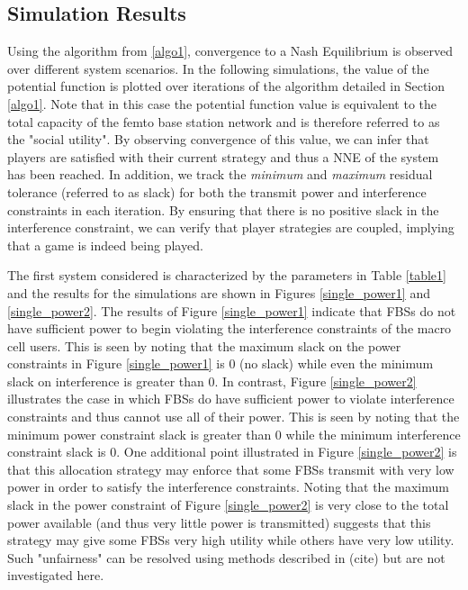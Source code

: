 \subsection{Simulation Results}
Using the algorithm from \ref{algo1}, convergence to a Nash Equilibrium is observed over different system scenarios. 
In the following simulations, the value of the potential function is plotted over iterations of the algorithm detailed in Section \ref{algo1}. Note that in this case the potential function value is equivalent to the total capacity of the femto base station network and is therefore referred to as the "social utility". By observing convergence of this value, we can infer that players are satisfied with their current strategy and thus a NNE of the system has been reached.  In addition, we track the \emph{minimum} and \emph{maximum} residual tolerance (referred to as slack) for both the transmit power and interference constraints in each iteration. By ensuring that there is no positive slack in the interference constraint, we can verify that player strategies are coupled, implying that a game is indeed being played. 
\par
The first system considered is characterized by the parameters in Table \ref{table1} and the results for the simulations are shown in Figures \ref{single_power1} and \ref{single_power2}. The results of Figure \ref{single_power1} indicate that FBSs do not have sufficient power to begin violating the interference constraints of the macro cell users. This is seen by noting that the maximum slack on the power constraints in Figure \ref{single_power1} is $0$ (no slack) while even the minimum slack on interference is greater than $0$. In contrast, Figure \ref{single_power2} illustrates the case in which FBSs do have sufficient power to violate interference constraints and thus cannot use all of their power. This is seen by noting that the minimum power constraint slack is greater than 0 while the minimum interference constraint slack is $0$. One additional point illustrated in Figure \ref{single_power2} is that this allocation strategy may enforce that some FBSs transmit with very low power in order to satisfy the interference constraints. Noting that the maximum slack in the power constraint of Figure \ref{single_power2} is very close to the total power available (and thus very little power is transmitted) suggests that this strategy may give some FBSs very high utility while others have very low utility. Such "unfairness" can be resolved using methods described in (cite) but are not investigated here.


